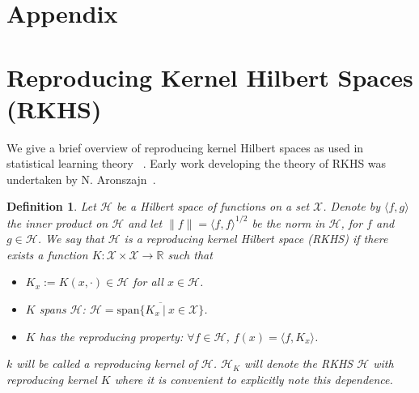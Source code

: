 \documentclass[11pt]{article}
\theoremstyle{plain}
\newtheorem{definition}[theorem]{Definition}
\newcommand{\RR}{\mathbb{R}}
\begin{document}
\appendix

\section*{Appendix}  


\section{Reproducing Kernel Hilbert Spaces (RKHS)} \label{sect:A}
 
We give a brief overview of reproducing kernel Hilbert spaces as used in statistical learning
theory ~\cite{CuckerandSmale}. Early work developing
the theory of RKHS was undertaken by N. Aronszajn~\cite{aronszajn50reproducing}.

\begin{definition} Let  ${\mathcal H}$  be a Hilbert space of functions on a set ${\mathcal X}$.
Denote by $\langle f, g \rangle$ the inner product on ${\mathcal H}$   and let $\|f\|= \langle f, f \rangle^{1/2}$
be the norm in ${\mathcal H}$, for $f$ and $g \in {\mathcal H}$. We say that ${\mathcal H}$ is a reproducing kernel
Hilbert space (RKHS) if there exists a function $K:{\mathcal X} \times {\mathcal X} \rightarrow \RR$
such that
\begin{itemize}
 \item[i.] $K_x:=K(x,\cdot)\in{\mathcal{H}}$ for all $x\in{\mathcal{H}}$.
\item[ii.] $K$ spans ${\mathcal H}$: ${\mathcal H}=\overline{\mbox{span}\{K_x~|~x \in {\mathcal X}\}}$.
 \item[iii.] $K$ has the {\em reproducing property}:
$\forall f \in {\mathcal H}$, $f(x)=\langle f,K_x \rangle$.
\end{itemize}
$k$ will be called a reproducing kernel  of ${\mathcal H}$. ${\mathcal H}_K$  will denote the RKHS ${\mathcal H}$
with reproducing kernel $K$ where it is convenient to explicitly note this dependence.
\end{definition}
\end{document}
